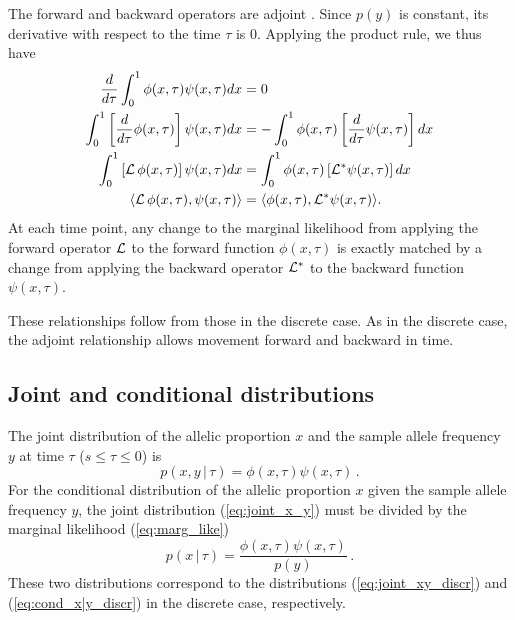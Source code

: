\documentclass[preprint]{elsarticle}
\newcommand\given{{\,|\,}}
\newcommand\eg{{\it e.g.,}}
\begin{document}
The forward and backward operators are adjoint \citep[\eg][]{Durr08}. Since $p(y)$ is constant, its derivative with respect to the time $\tau$ is $0$. Applying the product rule, we thus have
\begin{equation}\label{eq:adjoint_continuous}
\begin{split}
\frac{d}{d\tau}\int_{0}^{1} \phi(x,\tau) \psi(x,\tau)dx &= 0\\
\int_{0}^{1} \left[\frac{d}{d\tau} \phi(x,\tau)\right] \psi(x,\tau)dx &= -\int_{0}^{1} \phi(x,\tau) \left[\frac{d}{d\tau} \psi(x,\tau)\right] dx\\
\int_{0}^{1} \left[{\cal L}\,\phi(x,\tau)\right] \psi(x,\tau)dx &= \int_{0}^{1}  \phi(x,\tau) \left[{\cal L}^{*} \psi(x,\tau)\right] dx\\
\langle{\cal L}\,\phi(x,\tau), \psi(x,\tau)\rangle &= \langle \phi(x,\tau),{\cal L}^{*} \psi(x,\tau)\rangle.
\end{split}
\end{equation}
At each time point, any change to the marginal likelihood from applying the forward operator ${\cal L}$ to the forward function $\phi(x,\tau)$ is exactly matched by a change from applying the backward operator ${\cal L}^{*}$ to the backward function $\psi(x,\tau)$. 

These relationships follow from those in the discrete case. As in the discrete case, the adjoint relationship allows movement forward and backward in time. 

\subsection{Joint and conditional distributions}

The joint distribution of the allelic proportion $x$ and the sample allele frequency $y$ at time $\tau$ ($s \le \tau \le 0$) is
\begin{equation}\label{eq:joint_x_y}
p(x,y \given \tau)= \phi(x, \tau)\psi(x,\tau)\,.
\end{equation}
For the conditional distribution of the allelic proportion $x$ given the sample allele frequency $y$, the joint distribution (\ref{eq:joint_x_y}) must be divided by the marginal likelihood (\ref{eq:marg_like})
\begin{equation}\label{eq:cond_x|y}
p(x\given \tau)= \frac{\phi(x, \tau)\psi(x,\tau)}{p(y)}\,.
\end{equation}
These two distributions correspond to the distributions (\ref{eq:joint_xy_discr}) and (\ref{eq:cond_x|y_discr}) in the discrete case, respectively. 
\end{document}

